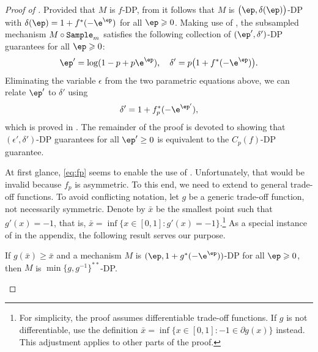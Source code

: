 
\begin{proof}[Proof of ]
Provided that $M$ is $f$-DP, from  it follows that $M$ is $\big(\ep,\delta(\ep)\big)$-DP with $\delta(\ep) = 1+f^*(- \e^{\ep})$ for all $\ep\geqslant 0$. Making use of , the subsampled mechanism $M \circ \mathtt{Sample}_m$ satisfies the following collection of $(\ep',\delta')$-DP guarantees for all $\ep\geqslant 0$:
\[
\ep' =\log(1 - p + p\e^\ep),\quad \delta' =p\big(1+f^*(-\e^{\ep})\big).
\]
Eliminating the variable $\epsilon$ from the two parametric equations above, we can relate $\ep'$ to $\delta'$ using
\begin{equation}\label{eq:fp}
\delta' = 1+f_p^*(-\e^{\ep'}),
\end{equation}
which is proved in . The remainder of the proof is devoted to showing that $(\epsilon', \delta')$-DP guarantees for all $\ep' \ge 0$ is equivalent to the $C_p(f)$-DP guarantee.


At first glance, \eqref{eq:fp} seems to enable the use of . Unfortunately, that would be invalid because $f_p$ is asymmetric. To this end, we need to extend  to general trade-off functions. To avoid conflicting notation, let $g$ be a generic trade-off function, not necessarily symmetric. Denote by $\bar{x}$ be the smallest point such that $g'(x)=-1$, that is, $\bar{x} = \inf\{x\in[0,1]:g'(x)=-1\}$.\footnote{For simplicity, the proof assumes differentiable trade-off functions. If $g$ is not differentiable, use the definition $\bar{x} = \inf\{x\in[0,1]: -1 \in \partial g(x) \}$ instead. This adjustment applies to other parts of the proof.} As a special instance of  in the appendix, the following result serves our purpose.
\begin{proposition}\label{prop:asymm_for_proof}
If $g(\bar{x})\geqslant\bar{x}$ and a mechanism $M$ is $(\ep,1+g^*(-\e^{\ep}))$-DP for all $\ep\geqslant 0$, then $M$ is $\min\{g,g^{-1}\}^{**}$-DP.
\end{proposition}



\end{proof}

